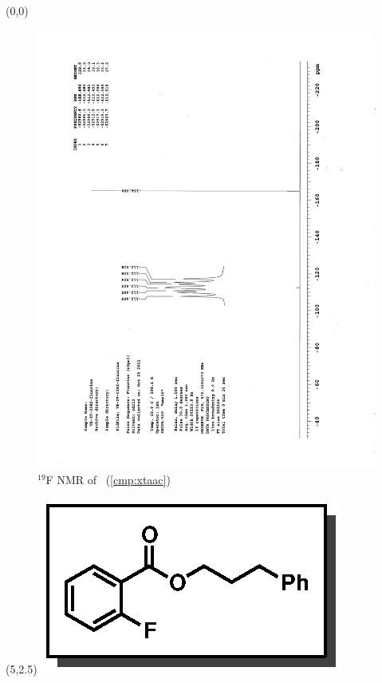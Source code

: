 \clearpage
\begin{textblock}{20}(0,0)
\begin{figure}[htb]
\caption{$^{19}$F NMR of  \CMPxtaac\ (\ref{cmp:xtaac})}
\includegraphics[scale=0.75, trim = 0mm 0mm 0mm 5mm,
clip]{chp_asymmetric/images/nmr/xtaacF}
\vspace{-100pt}
\end{figure}
\end{textblock}
\begin{textblock}{1}(5,2.5)
\includegraphics[scale=0.8, angle=90]{chp_asymmetric/images/xtaac}
\end{textblock}
\clearpage

